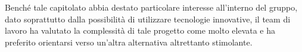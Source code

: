 Benché tale capitolato abbia destato particolare interesse all’interno del gruppo, dato soprattutto dalla possibilità di utilizzare tecnologie innovative, il team di lavoro ha valutato la complessità di tale progetto come molto elevata e ha preferito orientarsi verso un’altra alternativa altrettanto stimolante.
